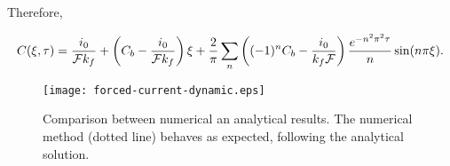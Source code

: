 Therefore,

\begin{align}
	C(\xi, \tau) = \frac{i_0}{\mathcal{F}k_f} +\left({C_b - \frac{i_0}{\mathcal{F}k_f}}\right)\xi +\frac{2}{\pi}\sum_n \left({(-1)^n C_b- \frac{i_0}{k_f\mathcal{F}}}\right) \frac{e^{-n^2\pi^2\tau}}{n}\sin(n\pi\xi).
\end{align}


\begin{figure}[htbp]
\centering
\texttt{[image: forced-current-dynamic.eps]}
\caption{Comparison between numerical an analytical results. The numerical method  (dotted line) behaves as expected, following the analytical solution.}
\label{fig:diffusion-reaction-comparison}
\end{figure}

\newpage
